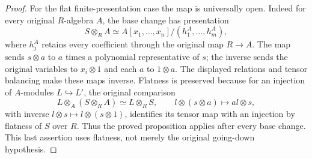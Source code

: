 \begin{proof}
For the flat finite-presentation case the map is
universally open. Indeed for every original
$R$-algebra $A$, the base change has presentation
$$
S\otimes_RA\simeq
A[x_1,\ldots,x_n]/(h_1^A,\ldots,h_m^A),
$$
where $h_j^A$ retains every coefficient through
the original map $R\to A$. The map sends
$s\otimes a$ to $a$ times a polynomial representative
of $s$; the inverse sends the original variables
to $x_i\otimes1$ and each $a$ to $1\otimes a$.
The displayed relations and tensor balancing make
these maps inverse. Flatness is preserved because
for an injection of $A$-modules $L\hookrightarrow L'$,
the original comparison
$$
L\otimes_A(S\otimes_RA)\simeq L\otimes_RS,
\qquad l\otimes(s\otimes a)\longmapsto al\otimes s,
$$
with inverse $l\otimes s\mapsto l\otimes(s\otimes1)$,
identifies its tensor map with an injection by
flatness of $S$ over $R$. Thus the proved proposition
applies after every base change. This last assertion
uses flatness, not merely the original going-down
hypothesis.
\end{proof}